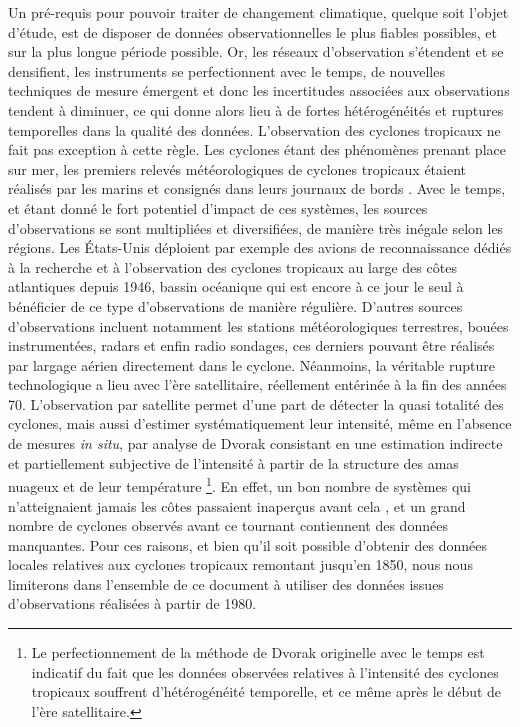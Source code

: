 \documentclass[../main.tex]{subfiles}
\begin{document}
Un pré-requis pour pouvoir traiter de changement climatique, quelque soit l'objet d'étude, est de disposer de données observationnelles le plus fiables
possibles, et sur la plus longue période possible. Or, les réseaux d'observation s'étendent et se densifient, les instruments se perfectionnent avec le temps,
de nouvelles techniques de mesure émergent et donc les incertitudes associées aux observations tendent à diminuer, ce qui donne alors lieu à de fortes
hétérogénéités et ruptures temporelles dans la qualité des données. L'observation des cyclones tropicaux ne fait pas exception à cette règle. Les cyclones étant
des phénomènes prenant place sur mer, les premiers relevés météorologiques de cyclones tropicaux étaient réalisés par les marins et consignés dans leurs
journaux de bords \parencite{knapp_international_2010}. Avec le temps, et étant donné le fort potentiel d'impact de ces systèmes, les sources d'observations se
sont multipliées et diversifiées, de manière très inégale selon les régions. Les États-Unis déploient par exemple des avions de reconnaissance dédiés à la
recherche et à l'observation des cyclones tropicaux au large des côtes atlantiques depuis \num{1946}, bassin océanique qui est encore à ce jour le seul à
bénéficier de ce type d'observations de manière régulière. D'autres sources d'observations incluent notamment les stations météorologiques terrestres, bouées
instrumentées, radars et enfin radio sondages, ces derniers pouvant être réalisés par largage aérien directement dans le cyclone. Néanmoins, la véritable
rupture technologique a lieu avec l'ère satellitaire, réellement entérinée à la fin des années 70. L'observation par satellite permet d'une part de détecter la
quasi totalité des cyclones, mais aussi d'estimer systématiquement leur intensité, même en l'absence de mesures \textit{in situ}, par analyse de Dvorak
consistant en une estimation indirecte et partiellement subjective de l'intensité à partir de la structure des amas nuageux et de leur température
\parencite{dvorak_tropical_1975,velden_development_1998,olander_development_2002,olander_advanced_2007,olander_advanced_2019}\footnote{Le perfectionnement de la
méthode de Dvorak originelle avec le temps est indicatif du fait que les données observées relatives à l'intensité des cyclones tropicaux souffrent
d'hétérogénéité temporelle, et ce même après le début de l'ère satellitaire.}. En effet, un bon nombre de systèmes qui n'atteignaient jamais les côtes passaient
inaperçus avant cela \parencite{landsea_atlantic_2004}, et un grand nombre de cyclones observés avant ce tournant contiennent des données manquantes. Pour ces
raisons, et bien qu'il soit possible d'obtenir des données locales relatives aux cyclones tropicaux remontant jusqu'en \num{1850}, nous nous limiterons dans
l'ensemble de ce document à utiliser des données issues d'observations réalisées à partir de \num{1980}.
\end{document}
